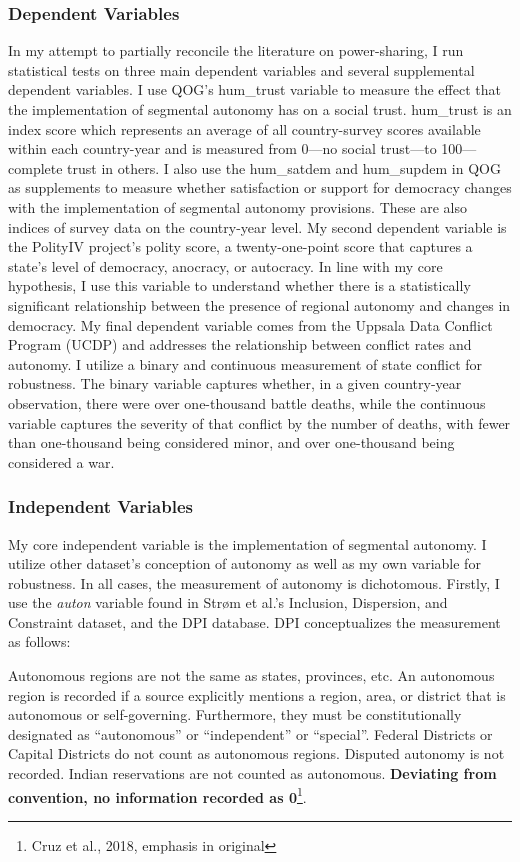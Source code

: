 \documentclass[12pt]{article}
\begin{document}
\subsubsection{Dependent Variables} 
In my attempt to partially reconcile the literature on power-sharing, I run statistical tests on three main dependent variables and several supplemental dependent variables. I use QOG’s hum\_trust variable to measure the effect that the implementation of segmental autonomy has on a social trust. hum\_trust is an index score which represents an average of all country-survey scores available within each country-year and is measured from 0—no social trust—to 100—complete trust in others. I also use the hum\_satdem and hum\_supdem in QOG as supplements to measure whether satisfaction or support for democracy changes with the implementation of segmental autonomy provisions. These are also indices of survey data on the country-year level. My second dependent variable is the PolityIV project’s polity score, a twenty-one-point score that captures a state’s level of democracy, anocracy, or autocracy. In line with my core hypothesis, I use this variable to understand whether there is a statistically significant relationship between the presence of regional autonomy and changes in democracy. My final dependent variable comes from the Uppsala Data Conflict Program (UCDP) and addresses the relationship between conflict rates and autonomy. I utilize a binary and continuous measurement of state conflict for robustness. The binary variable captures whether, in a given country-year observation, there were over one-thousand battle deaths, while the continuous variable captures the severity of that conflict by the number of deaths, with fewer than one-thousand being considered minor, and over one-thousand being considered a war. 

\subsubsection{Independent Variables} 
My core independent variable is the implementation of segmental autonomy. I utilize other dataset’s conception of autonomy as well as my own variable for robustness. In all cases, the measurement of autonomy is dichotomous. Firstly, I use the \textit{auton} variable found in Strøm et al.’s Inclusion, Dispersion, and Constraint dataset, and the DPI database. DPI conceptualizes the measurement as follows:

\singlespacing
Autonomous regions are not the same as states, provinces, etc. An autonomous region is recorded if a source explicitly mentions a region, area, or district that is autonomous or self-governing. Furthermore, they must be constitutionally designated as “autonomous” or “independent” or “special”. Federal Districts or Capital Districts do not count as autonomous regions. Disputed autonomy is not recorded. Indian reservations are not counted as autonomous. \textbf{Deviating from convention, no information recorded as 0}\footnote{Cruz et al., 2018, emphasis in original}.
\end{document}
